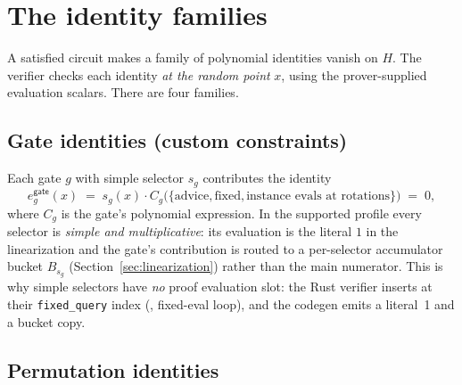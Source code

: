 \section{The identity families}
\label{sec:identities}

A satisfied circuit makes a family of polynomial identities vanish on $H$.
The verifier checks each identity \emph{at the random point} $x$, using the
prover-supplied evaluation scalars. There are four families.

\subsection{Gate identities (custom constraints)}
\label{sec:gate-ident}

Each gate $g$ with simple selector $s_g$ contributes the identity
\begin{equation}
  e^{\mathsf{gate}}_{g}(x) \;=\; s_g(x)\cdot C_g\!\bigl(\{\text{advice},\text{fixed},
  \text{instance evals at rotations}\}\bigr) \;=\; 0,
  \label{eq:gate-identity}
\end{equation}
where $C_g$ is the gate's polynomial expression. In the supported profile
every selector is \emph{simple and multiplicative}: its evaluation is the
literal $1$ in the linearization and the gate's contribution is routed to a
per-selector accumulator bucket $B_{s_g}$ (Section~\ref{sec:linearization})
rather than the main numerator. This is why simple selectors have \emph{no}
proof evaluation slot: the Rust verifier inserts  at their
\texttt{fixed\_\allowbreak{}query} index
(, fixed-eval loop), and the codegen emits a literal~1
and a bucket copy.

\subsection{Permutation identities}
\label{sec:perm-ident}

